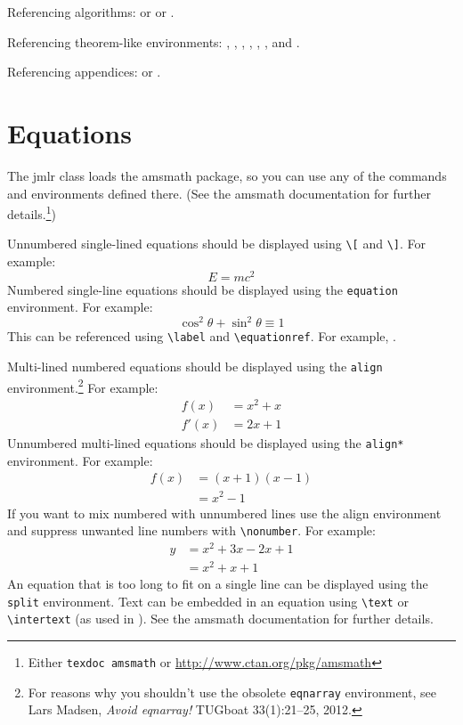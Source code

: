 \documentclass[mlabstract]{jmlr}
\begin{document}
Referencing algorithms:  or
 or
.

Referencing theorem-like environments: ,
, , 
, ,
,  and
.

Referencing appendices:  or
.

\section{Equations}
\label{sec:math}

The \textsf{jmlr} class loads the \textsf{amsmath} package, so
you can use any of the commands and environments defined there.
(See the \textsf{amsmath} documentation for further
details.\footnote{Either \texttt{texdoc amsmath} or
\url{http://www.ctan.org/pkg/amsmath}})

Unnumbered single-lined equations should be displayed using
\verb|\[| and \verb|\]|. For example:
\[E = m c^2\]
Numbered single-line equations should be displayed using the
\texttt{equation} environment. For example:
\begin{equation}\label{eq:trigrule}
\cos^2\theta + \sin^2\theta \equiv 1
\end{equation}
This can be referenced using \verb|\label| and \verb|\equationref|.
For example, .

Multi-lined numbered equations should be displayed using the
\texttt{align} environment.\footnote{For reasons why you 
shouldn't use the obsolete \texttt{eqnarray} environment, see
Lars Madsen, \emph{Avoid eqnarray!} TUGboat 33(1):21--25, 2012.} For example:
\begin{align}
f(x) &= x^2 + x\label{eq:f}\\
f'(x) &= 2x + 1\label{eq:df}
\end{align}
Unnumbered multi-lined equations should be displayed using the
\texttt{align*} environment. For example:
\begin{align*}
f(x) &= (x+1)(x-1)\\
&= x^2 - 1
\end{align*}
If you want to mix numbered with unnumbered lines use the
align environment and suppress unwanted line numbers with
\verb|\nonumber|. For example:
\begin{align}
y &= x^2 + 3x - 2x + 1\nonumber\\
&= x^2 + x + 1\label{eq:y}
\end{align}
An equation that is too long to fit on a single line can be
displayed using the \texttt{split} environment. 
Text can be embedded in an equation using \verb|\text| or
\verb|\intertext| (as used in ).
See the \textsf{amsmath} documentation for further details.
\end{document}
